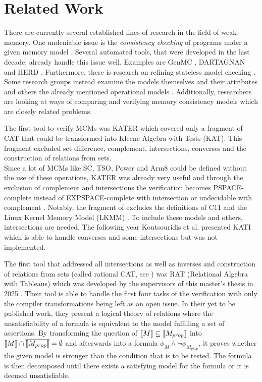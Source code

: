 \documentclass[a4paper,twoside,12pt, english]{article}
\begin{document}
\pagebreak
\section{Related Work}\label{sec:kontext}
There are currently several established lines of research in the field of weak memory. One undeniable issue is the \textit{consistency checking} of programs under a given memory model \cite{Tun+23,KokVaf21}. Several automated tools, that were developed in the last decade, already handle this issue well. Examples are GenMC \cite{KokVaf21}, DARTAGNAN \cite{Pon+18} and HERD \cite{Alg+14}.
Furthermore, there is research on refining stateless model checking \cite{Jon+25}.
Some research groups instead examine the models themselves and their attributes \cite{LahBok22} and others the already mentioned operational models \cite{Ior+23,Doh+22}. Additionally, researchers are looking at ways of comparing \cite{Wic+17,Sha+23} and verifying \cite{Kok+23,And+25,Kir+20} memory consistency models which are closely related problems.

The first tool to verify MCMs was KATER \cite{Kok+23} which covered only a fragment of CAT that could be transformed into Kleene Algebra with Tests (KAT). This fragment excluded set difference, complement, intersections, converses and the construction of relations from sets. \\
Since a lot of MCMs like SC, TSO, Power and Arm8 could be defined without the use of these operations, KATER was already very useful and through the exclusion of complement and intersections the verification becomes PSPACE-complete instead of EXPSPACE-complete with intersection \cite{KozSmi97,Nak17} or undecidable with complement \cite{TarGiv87}.
Notably, the fragment of \cite{Kok+23} excludes the definitions of C11 and the Linux Kernel Memory Model (LKMM) \cite{Kou+24}. To include these models and others, intersections are needed.
The following year Koutsouridis et al. presented KATI \cite{Kou+24} which is able to handle converses and some intersections but was not implemented.

The first tool that addressed all intersections as well as inverses and construction of relations from sets (called rational CAT, see ) was RAT (Relational Algebra with Tableaus) which was developed by the supervisors of this master's thesis in 2025 \cite{Gru+26}. Their tool is able to handle the first four tasks of the verification with only the compiler transformations being left as an open issue. In their yet to be published work, they present a logical theory of relations where the unsatisfiability of a formula is equivalent to the model fulfilling a set of assertions.
By transforming the question of $\llbracket M\rrbracket \subseteq \llbracket M_{prop} \rrbracket$ into $\llbracket M \rrbracket \cap \overline{\llbracket M_{prop} \rrbracket} = \emptyset$ and afterwards into a formula $ \phi_M \land \neg \phi_{M_{prop}}$, it proves whether the given model is stronger than the condition that is to be tested.
The formula is then decomposed until there exists a satisfying model for the formula or it is deemed unsatisfiable. 
\end{document}
